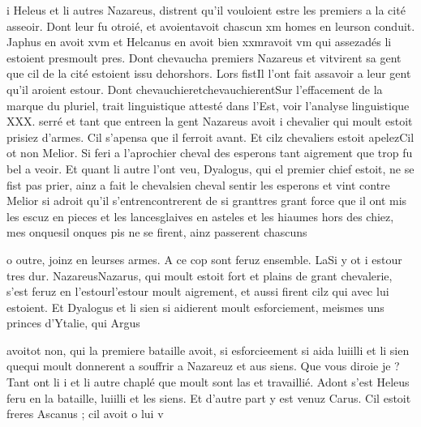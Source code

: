 \documentclass{article}
\begin{document}
\begin{pages}
                  
                  i
               Heleus et li autres Nazareus, distrent qu’il vouloient
                  estre les premiers a la cité asseoir. Dont leur fu otroié, et 
                  avoientavoit chascun xm homes en 
                  leurson conduit. Japhus en avoit xvm et Helcanus en 
                  avoit bien xxmravoit vm qui 
                  assezadés li estoient 
                  presmoult pres. Dont chevaucha premiers Nazareus et 
                  vitvirent sa gent que cil de la cité estoient issu 
                  dehorshors. 
                  Lors fistIl l'ont fait assavoir a leur gent qu’il aroient estour. Dont 
                  chevauchieretchevauchierentSur l'effacement de la marque du pluriel, trait
                  linguistique attesté dans l'Est, voir l'analyse linguistique XXX. serré et
               tant que 
                  entreen la gent Nazareus avoit i
               chevalier qui moult estoit prisiez d’armes. Cil
               s’apensa que il ferroit avant. 
                  Et cilz chevaliers estoit apelezCil ot non
               Melior. Si feri a l’aprochier cheval des esperons
               tant aigrement que trop fu bel a veoir. Et quant li autre l’ont veu, Dyalogus, qui el premier chief estoit, 
                  ne se fist pas prier, ainz a fait le 
                  chevalsien cheval sentir les esperons et vint contre Melior si
               adroit qu’il s’entrencontrerent de si 
                  granttres grant force que il ont mis les escuz en pieces et les 
                  lancesglaives en asteles et les hiaumes hors des chiez, mes 
                  onquesil onques pis ne se firent, ainz passerent chascuns 
                  
                  o outre, joinz en 
                  leurses armes. A ce cop sont feruz ensemble. 
                  LaSi y ot i estour tres dur. 
                     NazareusNazarus, qui moult estoit fort et plains de grant chevalerie, s’est
               feruz en 
                  l’estourl'estour moult aigrement, et aussi firent cilz qui avec lui estoient. Et Dyalogus et li sien si aidierent moult esforciement, meismes uns
               princes d’Ytalie, qui Argus
               
                  avoitot non, qui la premiere bataille avoit, si esforcieement si aida 
                  luiilli et li sien 
                  quequi moult donnerent a souffrir a Nazareuz et
               aus siens. Que vous diroie je ? Tant ont li i et
               li autre chaplé que moult sont las et travaillié. \pend
            \pstart Adont s’est Heleus
               feru en la bataille, 
                  luiilli et les siens. Et d’autre part y est venuz Carus. Cil estoit freres Ascanus ;
               cil avoit o lui v
               

\end{pages}
\end{document}
